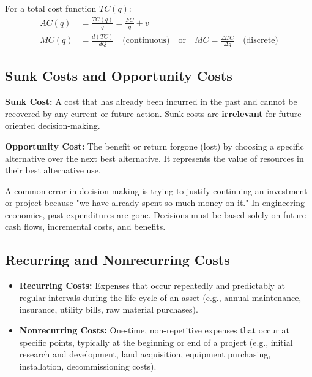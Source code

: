 \documentclass[12pt,a4paper]{article}
\begin{document}
\begin{tcolorbox}[formulabox, title={\textbf{Average and Marginal Cost Formulas}}]
For a total cost function $TC(q)$:
\begin{align}
  AC(q) &= \frac{TC(q)}{q} = \frac{FC}{q} + v \\[6pt]
  MC(q) &= \frac{d(TC)}{dQ} \quad \text{(continuous)} \quad \text{or} \quad MC = \frac{\Delta TC}{\Delta q} \quad \text{(discrete)}
\end{align}
\end{tcolorbox}

\subsection{Sunk Costs and Opportunity Costs}

\begin{tcolorbox}[defbox]
\textbf{Sunk Cost:} A cost that has already been incurred in the past and cannot be recovered by any current or future action. Sunk costs are \textbf{irrelevant} for future-oriented decision-making.
\par\vspace{3pt}
\textbf{Opportunity Cost:} The benefit or return forgone (lost) by choosing a specific alternative over the next best alternative. It represents the value of resources in their best alternative use.
\end{tcolorbox}

\begin{tcolorbox}[exambox, title={\textbf{Exam Tip: The Sunk Cost Fallacy}}]
A common error in decision-making is trying to justify continuing an investment or project because "we have already spent so much money on it." In engineering economics, past expenditures are gone. Decisions must be based solely on future cash flows, incremental costs, and benefits.
\end{tcolorbox}

\subsection{Recurring and Nonrecurring Costs}
\begin{itemize}[leftmargin=*, itemsep=3pt]
  \item \textbf{Recurring Costs:} Expenses that occur repeatedly and predictably at regular intervals during the life cycle of an asset (e.g., annual maintenance, insurance, utility bills, raw material purchases).
  \item \textbf{Nonrecurring Costs:} One-time, non-repetitive expenses that occur at specific points, typically at the beginning or end of a project (e.g., initial research and development, land acquisition, equipment purchasing, installation, decommissioning costs).
\end{itemize}
\end{document}
